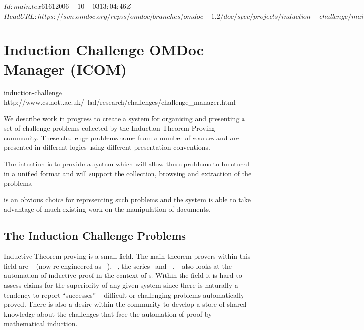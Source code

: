 \svnInfo $Id: main.tex 6161 2006-10-03 13:04:46Z  $
\svnKeyword $HeadURL: https://svn.omdoc.org/repos/omdoc/branches/omdoc-1.2/doc/spec/projects/induction-challenge/main.tex $

\section[Induction Challenge Problems]{Induction Challenge OMDoc Manager (ICOM)}

\begin{project}{induction-challenge}%
{http://www.cs.nott.ac.uk/~lad/research/challenges/challenge_manager.html}
\end{project}

We describe work in progress to create a system for organising and presenting a set of
challenge problems collected by the Induction Theorem
Proving community.  These challenge problems come from a number of sources and are
presented in different logics using different presentation conventions.

The intention is to provide a system which will allow these problems
to be stored in a unified format and will support the collection,
browsing and extraction of the problems.

{\omdoc} is an obvious choice for representing such problems and the system is able to
take advantage of much existing work on the manipulation of {\xml} documents.

\subsection{The Induction Challenge Problems}
Inductive Theorem proving is a small field.  The main
theorem provers within this field are {\nqthm}~\cite{NQTHM} (now re-engineered as
{\acltwo}~\cite{kaufmann96acl}), {\inka}~\cite{INKA5}, the {\clam}
series~\cite{pub507,lclamsysdesc} and {}~\cite{kapur95overview}.
{\twelf}~\cite{pfenning99system} also looks at the automation of inductive proof in the
context of s.  Within the field it is hard to assess claims
for the superiority of any given system since there is naturally a tendency to report
``successes'' -- difficult or challenging problems automatically proved.  There is also a
desire within the community to develop a store of shared knowledge about the challenges
that face the automation of proof by mathematical induction.

